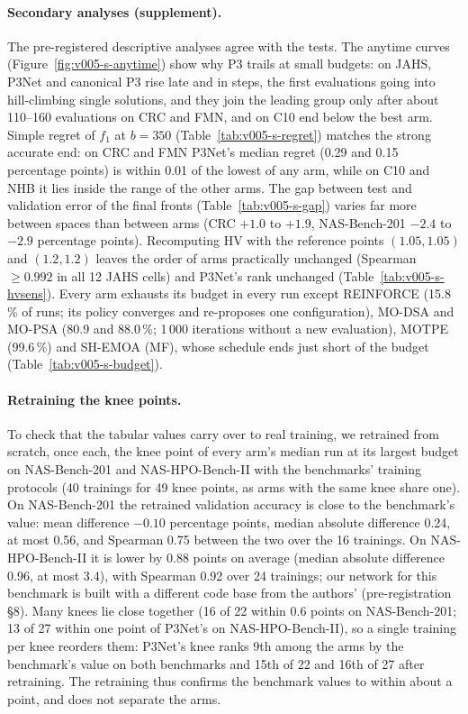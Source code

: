 \paragraph{Secondary analyses (supplement).} The pre-registered descriptive analyses agree with the tests.
The anytime curves (Figure~\ref{fig:v005-s-anytime}) show why P3 trails at small budgets: on JAHS, P3Net and canonical
P3 rise late and in steps, the first evaluations going into hill-climbing single solutions, and they join the leading
group only after about 110--160 evaluations on CRC and FMN, and on C10 end below the best arm. Simple regret of $f_1$ at $b = 350$
(Table~\ref{tab:v005-s-regret}) matches the strong accurate end: on CRC and FMN P3Net's median regret (0.29 and
0.15 percentage points) is within 0.01 of the lowest of any arm, while on C10 and NHB it lies inside the range of the
other arms. The gap between test and validation error of the final fronts (Table~\ref{tab:v005-s-gap}) varies far more
between spaces than between arms (CRC $+1.0$ to $+1.9$, NAS-Bench-201 $-2.4$ to $-2.9$ percentage points). Recomputing HV with the reference points
$(1.05, 1.05)$ and $(1.2, 1.2)$ leaves the order of arms practically unchanged (Spearman $\ge 0.992$ in all 12 JAHS
cells) and P3Net's rank unchanged (Table~\ref{tab:v005-s-hvsens}). Every arm exhausts its budget in every run except
REINFORCE (15.8\,\% of runs; its policy converges and re-proposes one configuration), MO-DSA and MO-PSA (80.9 and
88.0\,\%; 1\,000 iterations without a new evaluation), MOTPE (99.6\,\%) and SH-EMOA (MF), whose schedule ends just
short of the budget (Table~\ref{tab:v005-s-budget}).

\paragraph{Retraining the knee points.} To check that the tabular values carry over to real training, we retrained
from scratch, once each, the knee point of every arm's median run at its largest budget on NAS-Bench-201 and
NAS-HPO-Bench-II with the benchmarks' training protocols (40 trainings for 49 knee points, as arms with the same
knee share one). On NAS-Bench-201 the retrained validation accuracy is close to the benchmark's value: mean
difference $-0.10$ percentage points, median absolute difference 0.24, at most 0.56, and Spearman 0.75 between the
two over the 16 trainings. On NAS-HPO-Bench-II it is lower by 0.88 points on average (median absolute difference 0.96,
at most 3.4), with Spearman 0.92 over 24 trainings; our network for this benchmark is built with a different code
base from the authors' (pre-registration \S8). Many knees lie close together (16 of 22 within 0.6 points on
NAS-Bench-201; 13 of 27 within one point of P3Net's on NAS-HPO-Bench-II), so a single training per knee reorders them: P3Net's knee ranks 9th among the arms by the benchmark's value on both benchmarks and
15th of 22 and 16th of 27 after retraining. The retraining thus confirms the benchmark values to within about a
point, and does not separate the arms.
